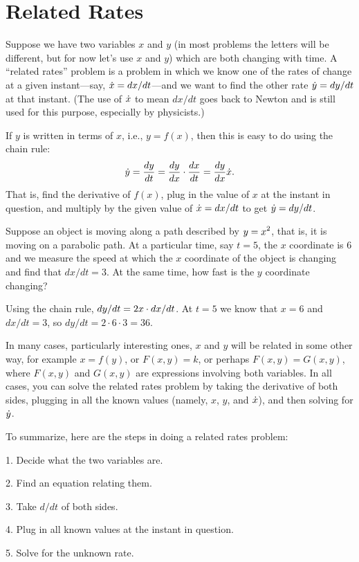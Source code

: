 \section{Related Rates}{}{}
\nobreak
Suppose we have two variables $x$ and $y$ (in most problems the
letters will be different, but for now let's use $x$ and $y$) which
are both changing with time.  A ``related rates'' problem is a problem
in which we know one of the rates of change at a given instant---say,
$\displaystyle \dot x = dx/dt$---and we want to find the other rate $\displaystyle \dot y = dy/dt$ at that
instant. (The use of $\displaystyle \dot x$ 
to mean $dx/dt$ goes back to Newton and
is still used for this purpose, especially by physicists.)

If $y$ is written in terms of $x$, i.e., $y=f(x)$, then this is easy
to do using the chain rule:
$$
\dot y = {dy\over dt}={dy\over dx}\cdot{dx\over dt}={dy\over dx}\dot x.
$$
That is, find the derivative of $f(x)$, plug in the value of
$x$ at the instant in question, and multiply by the given value of
$\displaystyle \dot{x}=dx/dt$ to get $\displaystyle \dot{y}=dy/dt$.

\example
Suppose an object is moving along a path described by $\displaystyle y=x^2$, that
is, it is moving on a parabolic path. At a particular time, say $t=5$,
the $x$ coordinate is 6 and 
we measure the speed at which the $x$ coordinate of the object is
changing and find that $dx/dt = 3$. At the same time, how fast is the
$y$ coordinate changing?

Using the chain rule, $\displaystyle dy/dt = 2x\cdot dx/dt$. At $t=5$ we know that
$x=6$ and $dx/dt=3$, so $dy/dt = 2\cdot 6\cdot 3 = 36$.
\endexample

In many cases, particularly interesting ones,
$x$ and $y$ will be related in some other way, for example
$x=f(y)$, or $F(x,y)=k$, or perhaps $F(x,y)=G(x,y)$, where $F(x,y)$
and $G(x,y)$ are expressions involving both variables.  In all cases, you
can solve the related rates problem by taking the derivative of both sides,
plugging in all the known values (namely, $x$, $y$, and $\displaystyle \dot{x}$), and
then solving for $\displaystyle \dot{y}$.

To summarize, here are the steps in doing a related rates problem:

\beginlist

\item{1.} Decide what the two variables are.
\item{2.}  Find an equation relating them.
\item{3.}  Take $d/dt$ of both sides.
\item{4.}  Plug in all known values at the instant in question.
\item{5.}  Solve for the unknown rate.

